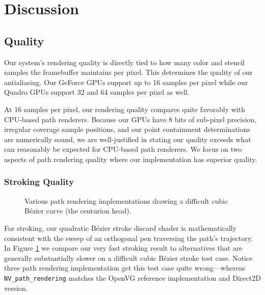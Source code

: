 
\section{Discussion}
\label{sec:discuss}

\subsection{Quality}

Our system's rendering quality is directly tied to how many color and
stencil samples the framebuffer maintains per pixel.  This determines the
quality of our antialiasing.  Our GeForce GPUs support up to 16 samples
per pixel while our Quadro GPUs support 32 and 64 samples per pixel as
well.

At 16 samples per pixel, our rendering quality compares quite favorably
with CPU-based path renderers.  Because our GPUs have 8 bits of sub-pixel
precision, irregular coverage sample positions, and our point containment
determinations are numerically sound, we are well-justified in stating
our quality exceeds what can reasonably be expected for CPU-based path
renderers.
We focus on two aspects of path rendering quality where our implementation
has superior quality.

\subsubsection{Stroking Quality}

\begin{figure}[tb]
  \caption{\label{fig:stroke-quality} Various path rendering
  implementations drawing a difficult cubic B\'{e}zier curve (the
  centurion head).}
\end{figure}

For stroking, our quadratic B\'{e}zier stroke discard shader is
mathematically consistent with the sweep of an orthogonal pen traversing
the path's trajectory.  In Figure \ref{fig:stroke-quality} we compare
our very fast stroking result to alternatives that are generally
substantially slower on a difficult cubic B\'{e}zier stroke test case.
Notice three path rendering implementation get this test case quite
wrong---whereas {\tt NV\_path\_rendering} matches the OpenVG reference
implementation and Direct2D version.
 

